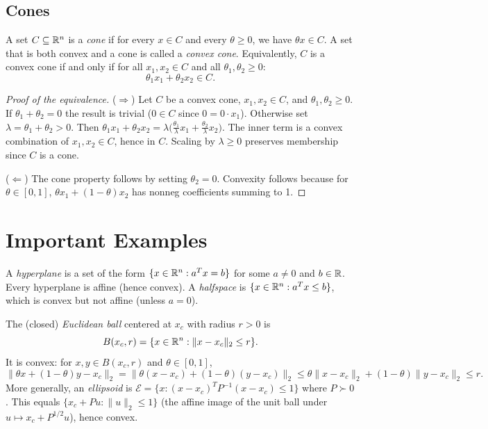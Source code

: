 \documentclass[11pt,a4paper]{article}
\begin{document}
\subsection{Cones}

\begin{definition}
\label{def:cone}
A set $C \subseteq \mathbb{R}^n$ is a \emph{cone} if for every $x \in C$ and every
$\theta \ge 0$, we have $\theta x \in C$.  A set that is both convex and a cone
is called a \emph{convex cone}.  Equivalently, $C$ is a convex cone if and only
if for all $x_1, x_2 \in C$ and all $\theta_1, \theta_2 \ge 0$:
\[
  \theta_1 x_1 + \theta_2 x_2 \in C.
\]
\end{definition}

\begin{proof}[Proof of the equivalence]
($\Rightarrow$) Let $C$ be a convex cone, $x_1, x_2 \in C$, and
$\theta_1, \theta_2 \ge 0$.  If $\theta_1 + \theta_2 = 0$ the result is
trivial ($0 \in C$ since $0 = 0 \cdot x_1$).  Otherwise set
$\lambda = \theta_1 + \theta_2 > 0$.  Then $\theta_1 x_1 + \theta_2 x_2 =
\lambda\bigl(\tfrac{\theta_1}{\lambda} x_1 + \tfrac{\theta_2}{\lambda}
x_2\bigr)$.  The inner term is a convex combination of $x_1, x_2 \in C$,
hence in $C$.  Scaling by $\lambda \ge 0$ preserves membership since $C$ is a
cone.

($\Leftarrow$) The cone property follows by setting $\theta_2 = 0$.
Convexity follows because for $\theta \in [0,1]$, $\theta x_1 + (1-\theta)
x_2$ has nonneg coefficients summing to 1.
\end{proof}


\section{Important Examples}

\begin{example}
\label{ex:hyperplane}
A \emph{hyperplane} is a set of the form
$\{x \in \mathbb{R}^n : a^T x = b\}$ for some $a \ne 0$ and $b \in \mathbb{R}$.  Every
hyperplane is affine (hence convex).  A \emph{halfspace} is
$\{x \in \mathbb{R}^n : a^T x \le b\}$, which is convex but not affine (unless
$a = 0$).
\end{example}

\begin{example}
\label{ex:ball-ellipsoid}
The (closed) \emph{Euclidean ball} centered at $x_c$ with radius $r > 0$ is
\[
  B(x_c, r) = \{x \in \mathbb{R}^n : \|x - x_c\|_2 \le r\}.
\]
It is convex: for $x, y \in B(x_c, r)$ and $\theta \in [0,1]$,
\[
  \|\theta x + (1-\theta) y - x_c\|_2
  = \|\theta(x - x_c) + (1-\theta)(y - x_c)\|_2
  \le \theta\|x - x_c\|_2 + (1-\theta)\|y - x_c\|_2
  \le r.
\]
More generally, an \emph{ellipsoid} is
$\mathcal{E} = \{x : (x - x_c)^T P^{-1} (x - x_c) \le 1\}$ where $P \succ 0$.
This equals $\{x_c + Pu : \|u\|_2 \le 1\}$ (the affine image of the unit
ball under $u \mapsto x_c + P^{1/2} u$), hence convex.
\end{example}
\end{document}
